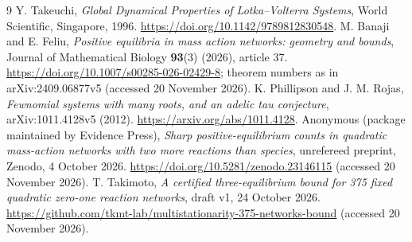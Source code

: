 \documentclass[11pt]{article}
\theoremstyle{remark}\newtheorem{remark}[theorem]{Remark}
\begin{document}
\begin{thebibliography}{9}
 Y. Takeuchi, \emph{Global Dynamical Properties of
Lotka--Volterra Systems}, World Scientific, Singapore, 1996.
\url{https://doi.org/10.1142/9789812830548}.
 M. Banaji and E. Feliu,
\emph{Positive equilibria in mass action networks: geometry and bounds}, Journal of
Mathematical Biology \textbf{93}(3) (2026), article 37.
\url{https://doi.org/10.1007/s00285-026-02429-8}; theorem numbers as in
arXiv:2409.06877v5 (accessed 20 November 2026).
 K. Phillipson and J. M. Rojas,
\emph{Fewnomial systems with many roots, and an adelic tau conjecture},
arXiv:1011.4128v5 (2012). \url{https://arxiv.org/abs/1011.4128}.
 Anonymous (package maintained by Evidence Press),
\emph{Sharp positive-equilibrium counts in quadratic mass-action networks with two
more reactions than species}, unrefereed preprint, Zenodo, 4 October 2026.
\url{https://doi.org/10.5281/zenodo.23146115} (accessed 20 November 2026).
 T. Takimoto,
\emph{A certified three-equilibrium bound for 375 fixed quadratic zero-one reaction
networks}, draft v1, 24 October 2026.
\url{https://github.com/tkmt-lab/multistationarity-375-networks-bound}
(accessed 20 November 2026).
\end{thebibliography}
\end{document}
